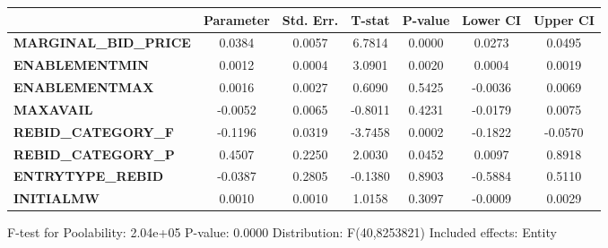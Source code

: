 \begin{center}
\begin{tabular}{lclc}
\bottomrule
\end{tabular}
\begin{tabular}{lcccccc}
                              & \textbf{Parameter} & \textbf{Std. Err.} & \textbf{T-stat} & \textbf{P-value} & \textbf{Lower CI} & \textbf{Upper CI}  \\
\midrule
\textbf{MARGINAL\_BID\_PRICE} &       0.0384       &       0.0057       &      6.7814     &      0.0000      &       0.0273      &       0.0495       \\
\textbf{ENABLEMENTMIN}        &       0.0012       &       0.0004       &      3.0901     &      0.0020      &       0.0004      &       0.0019       \\
\textbf{ENABLEMENTMAX}        &       0.0016       &       0.0027       &      0.6090     &      0.5425      &      -0.0036      &       0.0069       \\
\textbf{MAXAVAIL}             &      -0.0052       &       0.0065       &     -0.8011     &      0.4231      &      -0.0179      &       0.0075       \\
\textbf{REBID\_CATEGORY\_F}   &      -0.1196       &       0.0319       &     -3.7458     &      0.0002      &      -0.1822      &      -0.0570       \\
\textbf{REBID\_CATEGORY\_P}   &       0.4507       &       0.2250       &      2.0030     &      0.0452      &       0.0097      &       0.8918       \\
\textbf{ENTRYTYPE\_REBID}     &      -0.0387       &       0.2805       &     -0.1380     &      0.8903      &      -0.5884      &       0.5110       \\
\textbf{INITIALMW}            &       0.0010       &       0.0010       &      1.0158     &      0.3097      &      -0.0009      &       0.0029       \\
\bottomrule
\end{tabular}
\end{center}

F-test for Poolability: 2.04e+05 \newline
 P-value: 0.0000 \newline
 Distribution: F(40,8253821) \newline
  \newline
 Included effects: Entity